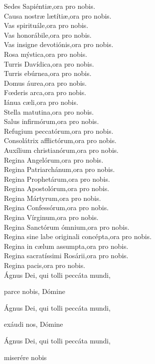 Sedes Sapiénti{\ae},{\hfill}ora pro nobis.\\
Causa nostr{\ae} l{\ae}títi{\ae},{\hfill}ora pro nobis.\\
Vas spirituále,{\hfill}ora pro nobis.\\
Vas honorábile,{\hfill}ora pro nobis.\\
Vas insigne devotiónis,{\hfill}ora pro nobis.\\
Rosa mýstica,{\hfill}ora pro nobis.\\
Turris Davídica,{\hfill}ora pro nobis.\\
Turris ebúrnea,{\hfill}ora pro nobis.\\
Domus áurea,{\hfill}ora pro nobis.\\
F{\oe}deris arca,{\hfill}ora pro nobis.\\
Iánua c{\ae}li,{\hfill}ora pro nobis.\\
Stella matutina,{\hfill}ora pro nobis.\\
Salus infirmórum,{\hfill}ora pro nobis.\\
Refugium peccatórum,{\hfill}ora pro nobis.\\
Consolátrix afflictórum,{\hfill}ora pro nobis.\\
Auxílium christianórum,{\hfill}ora pro nobis.\\
Regina Angelórum,{\hfill}ora pro nobis.\\
Regina Patriarchánum,{\hfill}ora pro nobis.\\
Regina Prophetárum,{\hfill}ora pro nobis.\\
Regina Apostolórum,{\hfill}ora pro nobis.\\
Regina Mártyrum,{\hfill}ora pro nobis.\\
Regina Confessórum,{\hfill}ora pro nobis.\\
Regina Vírginum,{\hfill}ora pro nobis.\\
Regina Sanctórum ómnium,{\hfill}ora pro nobis.\\
Regina sine labe originali concépta,{\hfill}ora pro nobis.\\
Regina in c{\ae}lum assumpta,{\hfill}ora pro nobis.\\
Regina sacratíssimi Rosárii,{\hfill}ora pro nobis.\\
Regina pacis,{\hfill}ora pro nobis.\\
Ágnus Dei, qui tolli peccáta mundi,

{\hfill}parce nobis, Dómine  

Ágnus Dei, qui tolli peccáta mundi, 

{\hfill}exáudi nos, Dómine

Ágnus Dei, qui tolli peccáta mundi, 

{\hfill}miserére nobis
